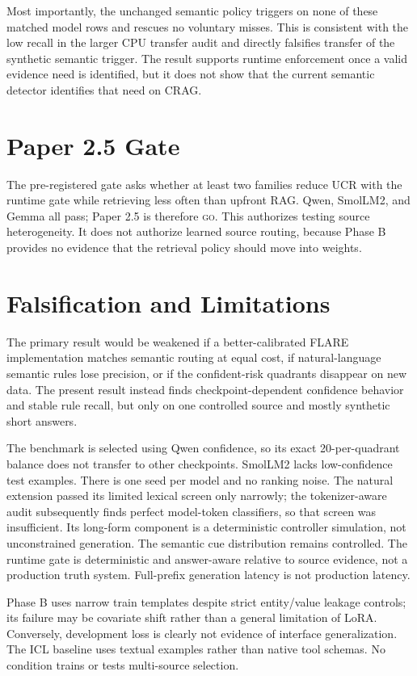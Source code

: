 \documentclass[11pt]{article}
\begin{document}
Most importantly, the unchanged semantic policy triggers on none of these
matched model rows and rescues no voluntary misses. This is consistent with the
low recall in the larger CPU transfer audit and directly falsifies transfer of
the synthetic semantic trigger. The result supports runtime enforcement once a
valid evidence need is identified, but it does not show that the current
semantic detector identifies that need on CRAG.

\section{Paper 2.5 Gate}
The pre-registered gate asks whether at least two families reduce UCR with the
runtime gate while retrieving less often than upfront RAG. Qwen, SmolLM2, and
Gemma all pass; Paper 2.5 is therefore \textsc{go}. This authorizes testing
source heterogeneity. It does not authorize learned source routing, because
Phase B provides no evidence that the retrieval policy should move into weights.

\section{Falsification and Limitations}
The primary result would be weakened if a better-calibrated FLARE implementation
matches semantic routing at equal cost, if natural-language semantic rules lose
precision, or if the confident-risk quadrants disappear on new data. The present
result instead finds checkpoint-dependent confidence behavior and stable rule
recall, but only on one controlled source and mostly synthetic short answers.

The benchmark is selected using Qwen confidence, so its exact 20-per-quadrant
balance does not transfer to other checkpoints. SmolLM2 lacks low-confidence test
examples. There is one seed per model and no ranking noise. The natural
extension passed its limited lexical screen only narrowly; the tokenizer-aware
audit subsequently finds perfect model-token classifiers, so that screen was
insufficient. Its long-form component is a deterministic controller simulation,
not unconstrained generation. The semantic cue distribution remains controlled.
The runtime gate is
deterministic and answer-aware relative to source evidence, not a production
truth system. Full-prefix generation latency is not production latency.

Phase B uses narrow train templates despite strict entity/value leakage controls;
its failure may be covariate shift rather than a general limitation of LoRA.
Conversely, development loss is clearly not evidence of interface
generalization. The ICL baseline uses textual examples rather than native tool
schemas. No condition trains or tests multi-source selection.
\end{document}
